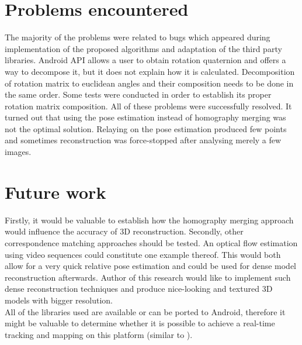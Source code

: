 \section{Problems encountered}
The majority of the problems were related to bugs which appeared during implementation of the proposed algorithms and adaptation of the third party libraries. Android API allows a user to obtain rotation quaternion and offers a way to decompose it, but it does not explain how it is calculated. Decomposition of rotation matrix to euclidean angles and their composition needs to be done in the same order. Some tests were conducted in order to establish its proper rotation matrix composition. All of these problems were successfully resolved. It turned out that using the pose estimation instead of homography merging was not the optimal solution. Relaying on the pose estimation produced few points and sometimes reconstruction was force-stopped after analysing merely a few images.
\section{Future work}
Firstly, it would be valuable to establish how the homography merging approach would influence the accuracy of 3D reconstruction. Secondly, other correspondence matching approaches should be tested. An optical flow estimation using video sequences could constitute one example thereof. This would both allow for a very quick relative pose estimation and could be used for dense model reconstruction afterwards. Author of this research would like to implement such dense reconstruction techniques and produce nice-looking and textured 3D models with bigger resolution. \\
All of the libraries used are available or can be ported to Android, therefore it might be valuable to determine whether it is possible to achieve a real-time tracking and mapping on this platform (similar to \cite{ptam}).



